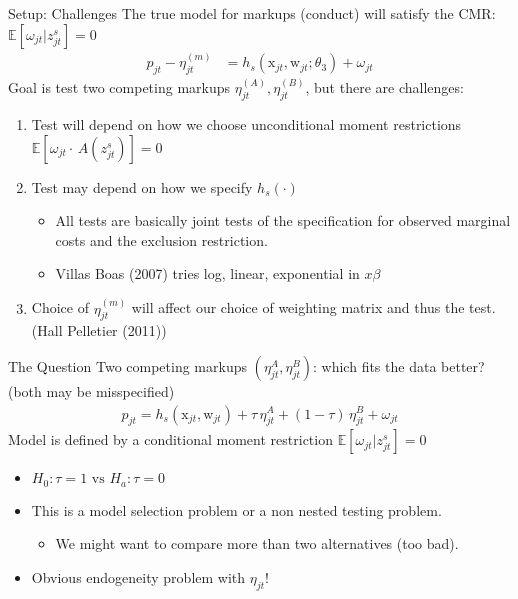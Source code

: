 \begin{frame}{Setup: Challenges}
The true model for markups (conduct) will satisfy the CMR: $\mathbb{E}[\omega_{jt} | z_{jt}^s]=0$
\begin{align*}p_{jt} - \eta_{jt}^{(m)} &= h_s(\textrm{x}_{jt}, \textrm{w}_{jt}; \theta_3) + \omega_{jt}
\end{align*}
Goal is test two competing markups $\eta_{jt}^{(A)},\eta_{jt}^{(B)}$, but there are challenges:

\begin{enumerate}
\item Test will depend on how we choose \alert{unconditional moment restrictions} $\mathbb{E}[\omega_{jt} \cdot \, A(z_{jt}^s)]=0$

\item Test may depend on how we specify $h_s(\cdot)$
\begin{itemize}
\item All tests are basically joint tests of the specification for \alert{observed marginal costs} and the  \alert{exclusion restriction}.
\item Villas Boas (2007) tries log, linear, exponential in $x \beta $
\end{itemize}

\item Choice of $\eta_{jt}^{(m)}$ will affect our choice of \alert{weighting matrix} and thus the test. (Hall Pelletier (2011))
\end{enumerate}
\end{frame}




\begin{frame}{The Question}
Two competing markups $(\eta_{jt}^A, \eta_{jt}^B)$: which fits the data better?\\
(both may be misspecified)
\begin{align*}
p_{jt} = h_s(\textrm{x}_{jt},\textrm{w}_{jt}) + \tau\, \eta_{jt}^A + (1-\tau)\,\eta_{jt}^B + \omega_{jt}
\end{align*}
Model is defined by a conditional moment restriction $\mathbb{E}[\omega_{jt}  | z_{jt}^s]=0$
\begin{itemize}
\item $H_0: \tau =1 \text{ vs } H_a: \tau = 0$
\item This is a \alert{model selection} problem or a \alert{non nested testing} problem.
\begin{itemize}
\item We might want to compare more than two alternatives (too bad).
\end{itemize}
\item Obvious endogeneity problem with $\eta_{jt}$!
\end{itemize}
\end{frame}



